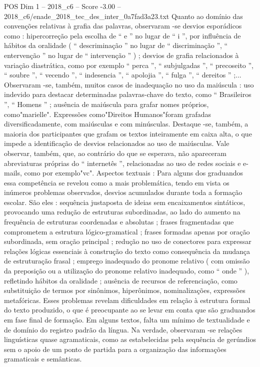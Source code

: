 \begin{textsample}{POS Dim 1 – 2018\_c6 – Score -3.00 – 2018\_c6/enade\_2018\_tec\_des\_inter\_0a7fad3a23.txt}
Quanto ao domínio das convenções relativas à grafia das palavras, observaram -se desvios esporádicos como : hipercorreção pela escolha de “ e ” no lugar de “ i ”, por influência de hábitos da oralidade ( “ descriminação ” no lugar de “ discriminação ”, “ entervenção ” no lugar de “ intervenção ” ) ; desvios de grafia relacionados à variação diastrática, como por exemplo “ perca ”, “ subjulgadas ”, “ precoseito ”, “ soubre ”, “ vecendo ”, “ indesencia ”, “ apolojia ”, “ fulga ”, “ dereitos ” ;...
Observaram -se, também, muitos casos de inadequação no uso da maiúscula : uso indevido para destacar determinadas palavras-chave do texto, como “ Brasileiros ”, “ Homens ” ; ausência de maiúscula para grafar nomes próprios, como"marielle".
Expressões como"Direitos Humanos"foram grafadas diversificadamente, com maiúsculas e com minúsculas.
Destaque -se, também, a maioria dos participantes que grafam os textos inteiramente em caixa alta, o que impede a identificação de desvios relacionados ao uso de maiúsculas.
Vale observar, também, que, ao contrário do que se esperava, não apareceram abreviaturas próprias do “ internetês ”, relacionadas ao uso de redes sociais e e-mails, como por exemplo"vc".
Aspectos textuais : Para alguns dos graduandos essa competência se revelou como a mais problemática, tendo em vista os inúmeros problemas observados, desvios acumulados durante toda a formação escolar.
São eles : sequência justaposta de ideias sem encaixamentos sintáticos, provocando uma redução de estruturas subordinadas, ao lado do aumento na frequência de estruturas coordenadas e absolutas ; frases fragmentadas que comprometem a estrutura lógico-gramatical ; frases formadas apenas por oração subordinada, sem oração principal ; redução no uso de conectores para expressar relações lógicas essenciais à construção do texto como consequência da mudança de estruturação frasal ; emprego inadequado do pronome relativo ( com omissão da preposição ou a utilização do pronome relativo inadequado, como “ onde ” ), refletindo hábitos da oralidade ; ausência de recursos de referenciação, como substituição de termos por sinônimos, hiperônimos, nominalizações, expressões metafóricas.
Esses problemas revelam dificuldades em relação à estrutura formal do texto produzido, o que é preocupante ao se levar em conta que são graduandos em fase final de formação.
Em alguns textos, falta um mínimo de textualidade e de domínio do registro padrão da língua.
Na verdade, observaram -se relações linguísticas quase agramaticais, como as estabelecidas pela sequência de gerúndios sem o apoio de um ponto de partida para a organização das informações gramaticais e semânticas.

\end{textsample}
